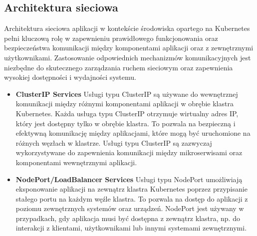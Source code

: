 \documentclass[12pt,a4paper]{article}
\begin{document}
\subsection{Architektura sieciowa}
\label{sec:ExampleResults}

Architektura sieciowa aplikacji w kontekście środowiska opartego na Kubernetes pełni kluczową rolę w zapewnieniu prawidłowego funkcjonowania oraz bezpieczeństwa komunikacji między komponentami aplikacji oraz z zewnętrznymi użytkownikami. Zastosowanie odpowiednich mechanizmów komunikacyjnych jest niezbędne do skutecznego zarządzania ruchem sieciowym oraz zapewnienia wysokiej dostępności i wydajności systemu.
\begin{itemize}
    \item \textbf{ClusterIP Services} Usługi typu ClusterIP są używane do wewnętrznej komunikacji między różnymi komponentami aplikacji w obrębie klastra Kubernetes. Każda usługa typu ClusterIP otrzymuje wirtualny adres IP, który jest dostępny tylko w obrębie klastra. To pozwala na bezpieczną i efektywną komunikację między aplikacjami, które mogą być uruchomione na różnych węzłach w klastrze. Usługi typu ClusterIP są zazwyczaj wykorzystywane do zapewnienia komunikacji między mikroserwisami oraz komponentami wewnętrznymi aplikacji.
    \item \textbf{NodePort/LoadBalancer Services} Usługi typu NodePort umożliwiają eksponowanie aplikacji na zewnątrz klastra Kubernetes poprzez przypisanie stałego portu na każdym węźle klastra. To pozwala na dostęp do aplikacji z poziomu zewnętrznych systemów oraz urządzeń. NodePort jest używany w przypadkach, gdy aplikacja musi być dostępna z zewnątrz klastra, np. do interakcji z klientami, użytkownikami lub innymi systemami zewnętrznymi.
\end{itemize}


\noindent
\nocite{*}
\end{document}
